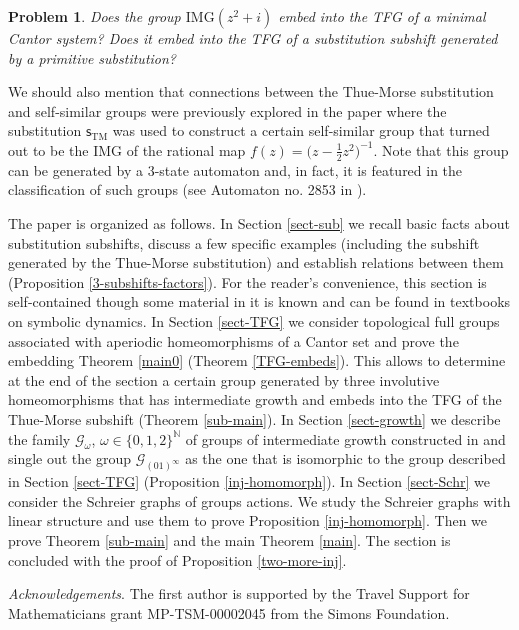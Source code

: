 \documentclass[12pt]{article}
\newtheorem{problem}[theorem]{Problem}
\theoremstyle{definition}
\def\bN{\mathbb{N}}
\def\cG{\mathcal{G}}
\def\om{\omega}
\def\subst{\mathsf{s}}
\def\TM{\subst_{\mathrm{TM}}}
\begin{document}
\begin{problem}\label{problem-IMG}
Does the group $\mathrm{IMG}(z^2+i)$ embed into the TFG of a minimal Cantor 
system?  Does it embed into the TFG of a substitution subshift generated by 
a primitive substitution?
\end{problem}

We should also mention that connections between the Thue-Morse substitution 
and self-similar groups were previously explored in the paper 
\cite{Barth:Thue-Morse} where the substitution $\TM$ was used to construct 
a certain self-similar group that turned out to be the IMG of the rational 
map $f(z)=\bigl(z-\frac12 z^2\bigr)^{-1}$.  Note that this group can be 
generated by a $3$-state automaton and, in fact, it is featured in the 
classification \cite{Classification} of such groups (see Automaton no.\@ 
2853 in \cite{Classification}).

The paper is organized as follows.  In Section \ref{sect-sub} we recall 
basic facts about substitution subshifts, discuss a few specific examples 
(including the subshift generated by the Thue-Morse substitution) and 
establish relations between them (Proposition \ref{3-subshifts-factors}).  
For the reader's convenience, this section is self-contained though some 
material in it is known and can be found in textbooks on symbolic dynamics.
In Section \ref{sect-TFG} we consider topological full groups associated
with aperiodic homeomorphisms of a Cantor set and prove the embedding 
Theorem \ref{main0} (Theorem \ref{TFG-embeds}).  This allows to determine 
at the end of the section a certain group generated by three involutive 
homeomorphisms that has intermediate growth and embeds into the TFG of the 
Thue-Morse subshift (Theorem \ref{sub-main}).  In Section \ref{sect-growth} 
we describe the family $\cG_\om$, $\om\in\{0,1,2\}^{\bN}$ of groups of 
intermediate growth constructed in \cite{Grig84} and single out the group 
$\cG_{(01)^\infty}$ as the one that is isomorphic to the group described in 
Section \ref{sect-TFG} (Proposition \ref{inj-homomorph}).  In Section 
\ref{sect-Schr} we consider the Schreier graphs of groups actions.  We 
study the Schreier graphs with linear structure and use them to prove 
Proposition \ref{inj-homomorph}.  Then we prove Theorem \ref{sub-main} and 
the main Theorem \ref{main}.  The section is concluded with the proof of 
Proposition \ref{two-more-inj}.

\medskip

\emph{Acknowledgements}.
The first author is supported by the Travel Support for Mathematicians 
grant MP-TSM-00002045 from the Simons Foundation.
\end{document}

